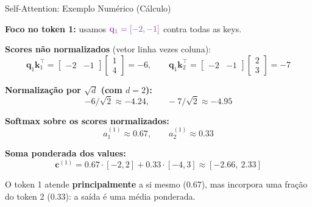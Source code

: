 \documentclass[aspectratio=169,xcolor=dvipsnames]{beamer}
\begin{document}
\begin{frame}[shrink=15]{Self-Attention: Exemplo Numérico (Cálculo)}

\textbf{Foco no token 1:} usamos $\textcolor{qcolor}{\mathbf{q}_1 = [-2, -1]}$ contra todas as keys.

\vspace{6pt}

\textbf{Scores não normalizados} (vetor linha vezes coluna):
\[
\mathbf{q}_1 \mathbf{k}_1^{\top} =
\begin{bmatrix} -2 & -1 \end{bmatrix}
\begin{bmatrix} 1 \\ 4 \end{bmatrix}
= -6, \qquad
\mathbf{q}_1 \mathbf{k}_2^{\top} =
\begin{bmatrix} -2 & -1 \end{bmatrix}
\begin{bmatrix} 2 \\ 3 \end{bmatrix}
= -7
\]

\vspace{4pt}

\textbf{Normalização por $\sqrt{d}$ (com $d=2$):}
\[
-6 / \sqrt{2} \approx -4.24, \qquad -7 / \sqrt{2} \approx -4.95
\]

\vspace{4pt}

\textbf{Softmax sobre os scores normalizados:}
\[
a_1^{(1)} \approx 0.67, \qquad a_2^{(1)} \approx 0.33
\]

\vspace{4pt}

\textbf{Soma ponderada dos values:}
\[
\mathbf{c}^{(1)} = 0.67 \cdot [-2, 2] + 0.33 \cdot [-4, 3] \approx [-2.66,\ 2.33]
\]

\vspace{4pt}
\centering
O token 1 atende \textbf{principalmente} a si mesmo (0.67), mas incorpora uma fração do token 2 (0.33): a saída é uma média ponderada.

\end{frame}

\end{document}

